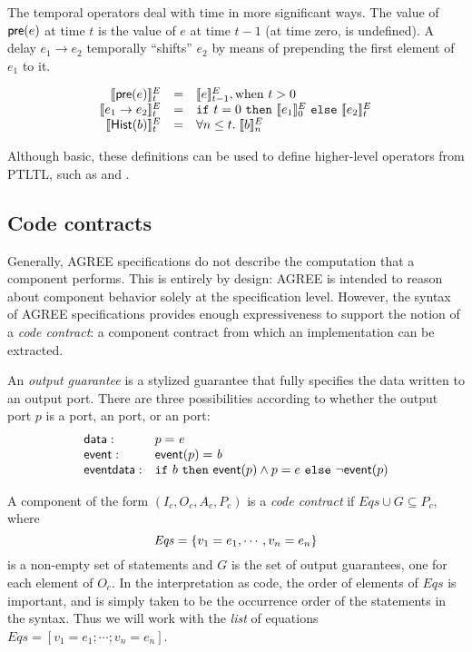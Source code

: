 The temporal operators deal with time in more significant ways. The
value of $\mathsf{pre}(e)$ at time $t$ is the value of $e$ at time
$t-1$ (at time zero,  is undefined).  A delay $e_1 \to e_2$
temporally ``shifts'' $e_2$ by means of prepending the first element
of $e_1$ to it.

\[
\begin{array}{rcl}
\sem{\konst{pre}(e)}^E_t & = & \sem{e}^E_{t-1}, \mathrm{when}\ t > 0 \\
\sem{e_1 \to e_2}^E_t & = & \itelse{t=0}{\sem{e_1}^E_0}{\sem{e_2}^E_t} \\
\sem{\konst{Hist}(b)}^E_t & = & \forall n \leq t.\; \sem{b}^E_n
\end{array}
\]

Although basic, these definitions can be used to define higher-level
operators from PTLTL, such as  and .

\subsection{Code contracts}

Generally, AGREE specifications do not describe the computation
that a component performs. This is entirely by design: AGREE is
intended to reason about component behavior solely at the
specification level. However, the syntax of AGREE specifications
provides enough expressiveness to support the notion of a
\emph{code contract}: a component contract from which an implementation
can be extracted.

\begin{definition}
An \emph{output guarantee} is a stylized guarantee that fully
specifies the data written to an output port. There are three
possibilities according to whether the output port $p$ is
a  port, an  port, or an 
port:
\[
\begin{array}{ll}
\mathsf{data}: &  p = \mathit{e} \\
\mathsf{event}: &  \mathsf{event} (p) = \mathit{b} \\
\mathsf{event data}: & \mbox{$\mathtt{if}\ {b}\ \mathtt{then}\ {\mathsf{event} (p) \land p = e}\ \mathtt{else}\ {\neg \mathsf{event}(p)}$} \\
\end{array}
\]
\end{definition}

\begin{definition}
A component of the form $(I_c,O_c,A_c,P_c)$ is a \emph{code contract}
if $\mathit{Eqs} \cup G \subseteq P_c$, where
\[\mathit{Eqs} = \{ {v_1 = e_1, \cdots , v_n = e_n} \} \] is a non-empty set
of  statements and $G$ is the set of output guarantees, one for
each element of $O_c$. In the interpretation as code, the order of
elements of $\mathit{Eqs}$ is important, and is simply taken to be the
occurrence order of the  statements in the syntax. Thus we
will work with the
\emph{list} of equations $\mathit{Eqs} = [v_1 = e_1; \cdots ; v_n = e_n]$.
\end{definition}
